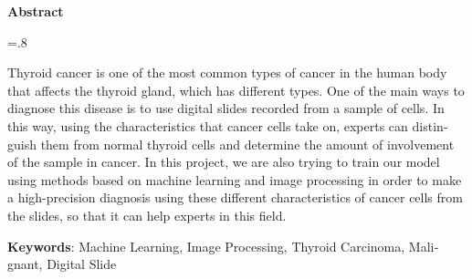 

\pagestyle{empty}

\begin{latin}

    \begin{center}
        \textbf{Abstract}
    \end{center}
    \baselineskip=.8\baselineskip

    Thyroid cancer is one of the most common types of cancer in the human body that affects the thyroid gland, which has different types.
    One of the main ways to diagnose this disease is to use digital slides recorded from a sample of cells.
    In this way, using the characteristics that cancer cells take on, experts can distinguish them from normal thyroid cells and determine the amount of involvement of the sample in cancer.
    In this project, we are also trying to train our model using methods based on machine learning and image processing in order to make a high-precision diagnosis using these different characteristics of cancer cells from the slides, so that it can help experts in this field.



    \bigskip\noindent\textbf{Keywords}:
    Machine Learning, Image Processing, Thyroid Carcinoma, Malignant, Digital Slide

\end{latin}

\newpage
